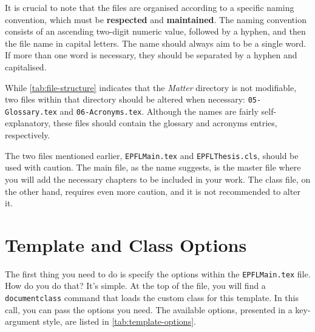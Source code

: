 It is crucial to note that the files are organised according to a specific naming convention, which must be \textbf{respected} and \textbf{maintained}. The naming convention consists of an ascending two-digit numeric value, followed by a hyphen, and then the file name in capital letters. The name should always aim to be a single word. If more than one word is necessary, they should be separated by a hyphen and capitalised.

\begin{block}[note]
While \autoref{tab:file-structure} indicates that the \textit{Matter} directory is not modifiable, two files within that directory should be altered when necessary: \texttt{05-Glossary.tex} and \texttt{06-Acronyms.tex}. Although the names are fairly self-explanatory, these files should contain the glossary and acronyms entries, respectively.
\end{block}

The two files mentioned earlier, \texttt{EPFLMain.tex} and \texttt{EPFLThesis.cls}, should be used with caution. The main file, as the name suggests, is the master file where you will add the necessary chapters to be included in your work. The class file, on the other hand, requires even more caution, and it is not recommended to alter it.

\section{Template and Class Options}
\label{sec:class-options}
The first thing you need to do is specify the options within the \texttt{EPFLMain.tex} file. How do you do that? It's simple. At the top of the file, you will find a \texttt{documentclass} command that loads the custom class for this template. In this call, you can pass the options you need. The available options, presented in a key-argument style, are listed in \autoref{tab:template-options}.


